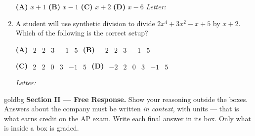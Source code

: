 \documentclass[10pt]{article}
\begin{document}
\begin{enumerate}[leftmargin=1.9em, itemsep=14pt]
      \smallskip
      \textbf{(A)} $x + 1$ \hspace{2.6em} \textbf{(B)} $x - 1$ \hspace{2.6em} \textbf{(C)} $x + 2$ \hspace{2.6em} \textbf{(D)} $x - 6$ \hfill\textit{Letter:}~\gradedblank[id=ap4, type=choice, points=1, answer=A]{0.42in}{13pt}

\item A student will use synthetic division to divide $2x^4 + 3x^2 - x + 5$ by $x + 2$. Which
      of the following is the correct setup?

      \smallskip
      {\setlength{\arraycolsep}{3pt}%
      \textbf{(A)} $\begin{array}{r|rrrr} 2 & 2 & 3 & -1 & 5 \end{array}$ \hspace{1.4em}
      \textbf{(B)} $\begin{array}{r|rrrr} -2 & 2 & 3 & -1 & 5 \end{array}$

      \smallskip
      \textbf{(C)} $\begin{array}{r|rrrrr} 2 & 2 & 0 & 3 & -1 & 5 \end{array}$ \hspace{1.4em}
      \textbf{(D)} $\begin{array}{r|rrrrr} -2 & 2 & 0 & 3 & -1 & 5 \end{array}$} \hfill\textit{Letter:}~\gradedblank[id=ap5, type=choice, points=1, answer=D]{0.42in}{13pt}

\end{enumerate}

\newpage

\begin{headlinebox}{goldbg}
\small
\textbf{Section II --- Free Response.} Show your reasoning outside the boxes. Answers about the
company must be written \emph{in context}, with units --- that is what earns credit on the AP
exam. Write each final answer in its box. Only what is inside a box is graded.
\end{headlinebox}

\vspace{0.04in}
\end{document}
